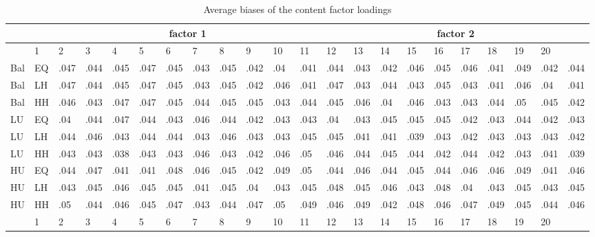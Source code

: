 \begin{table}
  \centering
  \caption{\label{tab4} Average biases of the content factor loadings}
  \begin{tabular}{ l l l l l l l l l l l l l l l l l l l l l l}
    \hline\noalign{\smallskip}
    &  &  \multicolumn{10}{c}{factor 1} & \multicolumn{10}{c}{factor 2}\\
    \hline\noalign{\smallskip}
    \multicolumn{2}{c}{Continuous} & 1 & 2 & 3 & 4 & 5 & 6 & 7 & 8 & 9 & 10 & 11 & 12 & 13 & 14 & 15 & 16 & 17 & 18 & 19 & 20 \\
    \hline
    \noalign{\smallskip}
    Bal & EQ & .047 & .044 & .045 & .047 & .045 & .043 & .045 & .042 & .04 & .041 & .044 & .043 & .042 & .046 & .045 & .046 & .041 & .049 & .042 & .044 \\
    Bal & LH & .047 & .044 & .045 & .047 & .045 & .043 & .045 & .042 & .046 & .041 & .047 & .043 & .044 & .043 & .045 & .043 & .041 & .046 & .04 & .041 \\
    Bal & HH & .046 & .043 & .047 & .047 & .045 & .044 & .045 & .045 & .043 & .044 & .045 & .046 & .04 & .046 & .043 & .043 & .044 & .05 & .045 & .042 \\
    \hline
    \noalign{\smallskip}
    LU & EQ & .04 & .044 & .047 & .044 & .043 & .046 & .044 & .042 & .043 & .043 & .04 & .043 & .045 & .045 & .045 & .042 & .043 & .044 & .042 & .043 \\
    LU & LH & .044 & .046 & .043 & .044 & .044 & .043 & .046 & .043 & .043 & .045 & .045 & .041 & .041 & .039 & .043 & .042 & .043 & .043 & .043 & .042 \\
    LU & HH & .043 & .043 & .038 & .043 & .043 & .046 & .043 & .042 & .046 & .05 & .046 & .044 & .045 & .044 & .042 & .044 & .042 & .043 & .041 & .039 \\
    \hline
    \noalign{\smallskip}
    HU & EQ & .044 & .047 & .041 & .041 & .048 & .046 & .045 & .042 & .049 & .05 & .044 & .046 & .044 & .045 & .044 & .046 & .046 & .049 & .041 & .046 \\
    HU & LH & .043 & .045 & .046 & .045 & .045 & .041 & .045 & .04 & .043 & .045 & .048 & .045 & .046 & .043 & .048 & .04 & .043 & .045 & .043 & .045 \\
    HU & HH & .05 & .044 & .046 & .045 & .047 & .043 & .044 & .047 & .05 & .049 & .046 & .049 & .042 & .048 & .046 & .047 & .049 & .045 & .044 & .046 \\
    \hline
    \noalign{\smallskip}
    \multicolumn{2}{c}{Ordinal} & 1 & 2 & 3 & 4 & 5 & 6 & 7 & 8 & 9 & 10 & 11 & 12 & 13 & 14 & 15 & 16 & 17 & 18 & 19 & 20 \\

\end{tabular}
\end{table}
